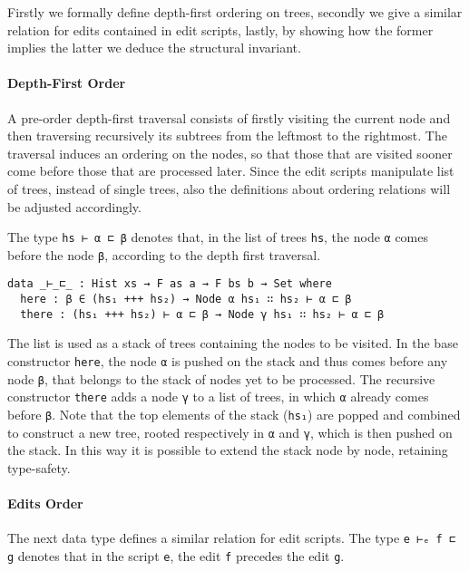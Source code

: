 \documentclass[preprint]{sigplanconf}
\begin{document}
    Firstly we formally define depth-first ordering on trees, secondly
    we give a similar relation for edits contained in edit scripts, 
    lastly, by showing how the former implies the latter we deduce
    the structural invariant.
    

    \paragraph{Depth-First Order}
    A pre-order depth-first traversal consists of firstly visiting the current node 
    and then traversing recursively its subtrees from the leftmost to the rightmost.
    The traversal induces an ordering on the nodes, so that those that
    are visited sooner come before those that are processed later.
    Since the edit scripts manipulate list of trees, instead of single trees,
    also the definitions about ordering relations will be adjusted accordingly.

    The type \texttt{hs ⊢ α ⊏ β} denotes that, in the list of trees \texttt{hs}, 
    the node \texttt{α} comes before the node \texttt{β}, according to the
    depth first traversal.

\begin{verbatim}
data _⊢_⊏_ : Hist xs → F as a → F bs b → Set where
  here : β ∈ (hs₁ +++ hs₂) → Node α hs₁ ∷ hs₂ ⊢ α ⊏ β
  there : (hs₁ +++ hs₂) ⊢ α ⊏ β → Node γ hs₁ ∷ hs₂ ⊢ α ⊏ β
\end{verbatim}

    The list is used as a stack of trees containing the nodes to be visited.
    In the base constructor \texttt{here}, the node \texttt{α} is pushed on the 
    stack and thus comes before any node \texttt{β}, that belongs to the
    stack of nodes yet to be processed.
    The recursive constructor \texttt{there} adds a node \texttt{γ} to a list of 
    trees, in which \texttt{α} already comes before \texttt{β}.
    Note that the top elements of the stack (\texttt{hs₁}) are popped 
    and combined to construct a new tree, rooted respectively 
    in \texttt{α} and \texttt{γ}, which is then pushed on the stack. 
    In this way it is possible to extend the stack node by node, 
    retaining type-safety. 

    \paragraph{Edits Order}
    The next data type defines a similar relation for edit scripts.
    The type \texttt{e ⊢ₑ f ⊏ g} denotes that in the script \texttt{e}, the edit
    \texttt{f} precedes the edit \texttt{g}.
\end{document}

